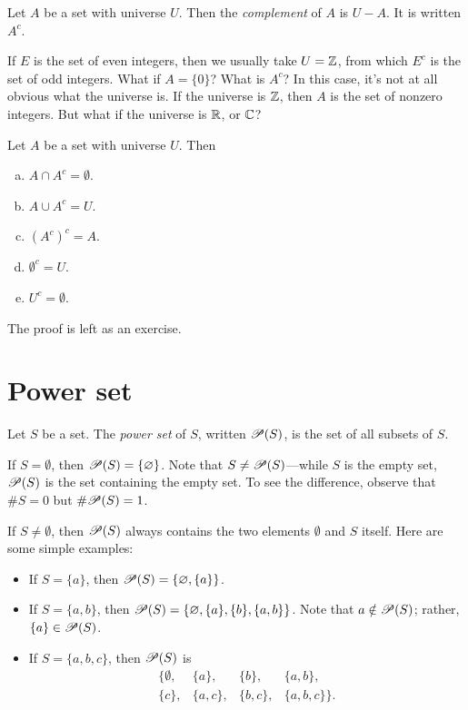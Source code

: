 \documentclass{tufte-book}
\begin{document}
\begin{definition}
  Let $A$ be a set with universe $U$. Then the \emph{complement} of $A$ is $U - A$. It is written $A^c$.
\end{definition}

If $E$ is the set of even integers, then we usually take $U = \mathbb{Z}$, from which $E^c$ is the set of odd integers. What if $A = \{0\}$? What is $A^c$? In this case, it's not at all obvious what the universe is. If the universe is $\mathbb{Z}$, then $A$ is the set of nonzero integers. But what if the universe is $\mathbb{R}$, or $\mathbb{C}$?

\begin{proposition}\label{prop:complements}
  Let $A$ be a set with universe $U$. Then
  \begin{enumerate}[(a)]
      \item $A \cap A^c = \emptyset$.
      \item $A \cup A^c = U$.
      \item $(A^c)^c = A$.
      \item $\emptyset^c = U$.
      \item $U^c = \emptyset$.
  \end{enumerate}
\end{proposition}

The proof is left as an exercise.



\section{Power set}
\label{sec:power-set}

\begin{definition}
  Let $S$ be a set. The \emph{power set} of $S$, written $\mathscr{P}(S)$,  is the set of all subsets of $S$.
\end{definition}
If $S = \emptyset$, then $\mathscr{P}(S) = \{\varnothing\}$. Note that $S \neq \mathscr{P}(S)$---while $S$ is the empty set, $\mathscr{P}(S)$ is the set containing the empty set. To see the difference, observe that $\# S = 0$ but $\# \mathscr{P}(S) = 1$.

If $S \neq \emptyset$, then $\mathscr{P}(S)$ always contains the two elements $\emptyset$ and $S$ itself. Here are some simple examples:
\begin{itemize}
    \item If $S = \{a\}$, then $\mathscr{P}(S) = \{\varnothing, \{a\}\}$.
    \item If $S = \{a, b\}$, then $\mathscr{P}(S) = \{\varnothing, \{a\}, \{b\}, \{a, b\}\}$. Note that $a \notin \mathscr{P}(S)$; rather, $\{a\} \in \mathscr{P}(S)$.
    \item If $S = \{a, b, c\}$, then $\mathscr{P}(S)$ is
  \[
  \begin{array}{cccc}
    \{\emptyset, & \{a\}, & \{b\}, & \{a, b\}, \\
    \{c\}, & \{a, c\}, & \{b, c\}, & \{a, b, c\}\}.
  \end{array}
  \]
\end{itemize}
\end{document}
